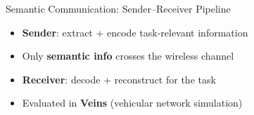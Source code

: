 \documentclass[aspectratio=169]{beamer}
\begin{document}
\begin{frame}{Semantic Communication: Sender–Receiver Pipeline}
\begin{center}

\end{center}

\vspace{0.15cm}

\begin{itemize}
    \item \textbf{Sender}: extract + encode task-relevant information
    \item Only \textbf{semantic info} crosses the wireless channel
    \item \textbf{Receiver}: decode + reconstruct for the task
    \item Evaluated in \textbf{Veins} (vehicular network simulation)
\end{itemize}

\end{frame}
\end{document}
